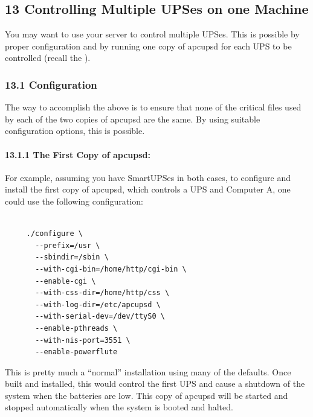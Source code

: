 {{{{{{{{{\label{Controlling-Multiple-UPSes-on-one-Machine}

\subsection*{13 Controlling Multiple UPSes on one Machine}

You may want to use your server to control multiple UPSes. This is possible by
proper configuration and by running one copy of apcupsd for each UPS to be
controlled (recall the 
). 

\label{Configuration}

\subsubsection*{13.1 Configuration}

The way to accomplish the above is to ensure that none of the critical files
used by each of the two copies of apcupsd are the same. By using suitable
configuration options, this is possible. 

\label{The-First-Copy-of-apcupsd}

\paragraph*{13.1.1 The First Copy of apcupsd:}

For example, assuming you have SmartUPSes in both cases, to configure and
install the first copy of apcupsd, which controls a UPS and Computer A, one
could use the following configuration: 

\footnotesize
\begin{verbatim}
     
     ./configure \
       --prefix=/usr \
       --sbindir=/sbin \
       --with-cgi-bin=/home/http/cgi-bin \
       --enable-cgi \
       --with-css-dir=/home/http/css \
       --with-log-dir=/etc/apcupsd \
       --with-serial-dev=/dev/ttyS0 \
       --enable-pthreads \
       --with-nis-port=3551 \
       --enable-powerflute
\end{verbatim}
\normalsize

This is pretty much a ``normal'' installation using many of the defaults. Once
built and installed, this would control the first UPS and cause a shutdown of
the system when the batteries are low.  This copy of apcupsd will be started
and stopped automatically when the system is booted and halted. 

}}}}}}}}}

